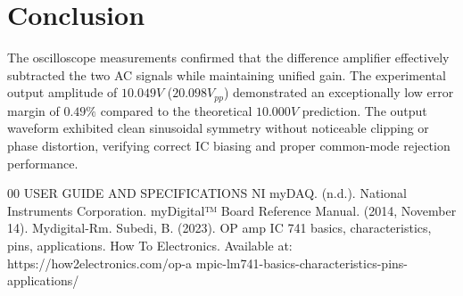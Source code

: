 \documentclass[conference]{IEEEtran}
\begin{document}
\section{Conclusion}
The oscilloscope measurements confirmed that the difference amplifier effectively subtracted the two AC signals while maintaining unified gain. The experimental output amplitude of $10.049{ V}$ ($20.098{ V}_{pp}$) demonstrated an exceptionally low error margin of $0.49\%$ compared to the theoretical $10.000{ V}$ prediction. The output waveform exhibited clean sinusoidal symmetry without noticeable clipping or phase distortion, verifying correct IC biasing and proper common-mode rejection performance\cite{b1,b3}.


 
\begin{thebibliography}{00}
 USER GUIDE AND SPECIFICATIONS NI myDAQ. (n.d.). National Instruments Corporation.
 myDigital™ Board Reference Manual. (2014, November 14). Mydigital-Rm.
 Subedi, B. (2023). OP amp IC 741 basics, characteristics, pins, applications. How To Electronics. Available at: https://how2electronics.com/op-a
mpic-lm741-basics-characteristics-pins-applications/

\end{thebibliography}
\end{document}

